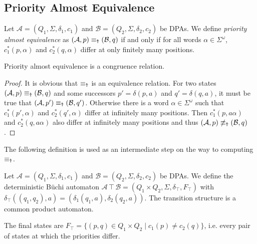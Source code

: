 \vspace{5pt}

\subsection{Priority Almost Equivalence}

\begin{defn}
	Let $\mathcal{A} = (Q_1, \Sigma, \delta_1, c_1)$ and $\mathcal{B} = (Q_2, \Sigma, \delta_2, c_2)$ be DPAs. We define \emph{priority almost equivalence} as $(\mathcal{A}, p) \equiv_\text{\Ankh} (\mathcal{B}, q)$ if and only if for all words $\alpha \in \Sigma^\omega$, $c_1^*(p, \alpha)$ and $c_2^*(q, \alpha)$ differ at only finitely many positions.
\end{defn}

\begin{lem}
	Priority almost equivalence is a congruence relation.
	\label{lem:general:Ankh_congruence}
\end{lem}

\begin{proof} 
	It is obvious that $\equiv_\text{\Ankh}$ is an equivalence relation. For two states $(\mathcal{A}, p) \equiv_\text{\Ankh} (\mathcal{B}, q)$ and some successors $p' = \delta(p, a)$ and $q' = \delta(q, a)$, it must be true that $(\mathcal{A}, p') \equiv_\text{\Ankh} (\mathcal{B}, q')$. Otherwise there is a word $\alpha \in \Sigma^\omega$ such that $c_1^*(p', \alpha)$ and $c_2^*(q', \alpha)$ differ at infinitely many positions. Then $c_1^*(p, a \alpha)$ and $c_2^*(q, a \alpha)$ also differ at infinitely many positions and thus $(\mathcal{A}, p) \not\equiv_\text{\Ankh} (\mathcal{B}, q)$.
\end{proof}

The following definition is used as an intermediate step on the way to computing $\equiv_\text{\Ankh}$.

\begin{defn}
	Let $\mathcal{A} = (Q_1, \Sigma, \delta_1, c_1)$ and $\mathcal{B} = (Q_2, \Sigma, \delta_2, c_2)$ be DPAs. We define the deterministic Büchi automaton $\mathcal{A} \intercal \mathcal{B} = (Q_1 \times Q_2, \Sigma, \delta_\intercal, F_\intercal)$ with $\delta_\intercal((q_1, q_2), a) = (\delta_1(q_1, a), \delta_2(q_2, a))$. The transition structure is a common product automaton.
	
	The final states are $F_\intercal = \{ (p, q) \in Q_1 \times Q_2 \mid c_1(p) \neq c_2(q) \}$, i.e. every pair of states at which the priorities differ. 
\end{defn}

